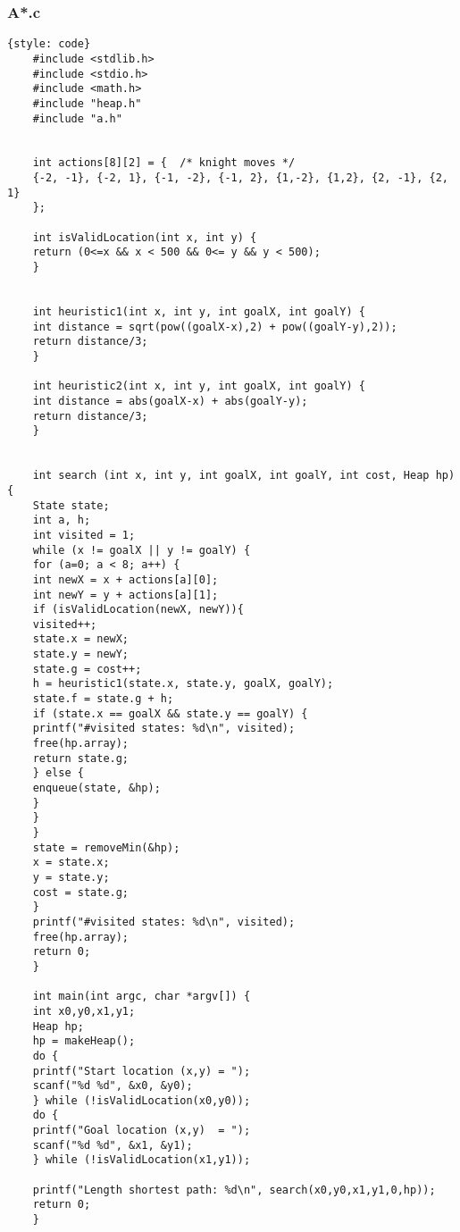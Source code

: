 \documentclass{article}
\begin{document}
	\subsubsection*{A*.c}
	\begin{lstlisting}{style: code}
	#include <stdlib.h>
	#include <stdio.h>
	#include <math.h>
	#include "heap.h"
	#include "a.h"
	
	
	int actions[8][2] = {  /* knight moves */
	{-2, -1}, {-2, 1}, {-1, -2}, {-1, 2}, {1,-2}, {1,2}, {2, -1}, {2, 1}
	};
	
	int isValidLocation(int x, int y) {
	return (0<=x && x < 500 && 0<= y && y < 500);
	}
	
	
	int heuristic1(int x, int y, int goalX, int goalY) {
	int distance = sqrt(pow((goalX-x),2) + pow((goalY-y),2));
	return distance/3;
	}
	
	int heuristic2(int x, int y, int goalX, int goalY) {
	int distance = abs(goalX-x) + abs(goalY-y);
	return distance/3;
	}
	
	
	int search (int x, int y, int goalX, int goalY, int cost, Heap hp) {
	State state;
	int a, h;
	int visited = 1;
	while (x != goalX || y != goalY) {
	for (a=0; a < 8; a++) {
	int newX = x + actions[a][0];
	int newY = y + actions[a][1];
	if (isValidLocation(newX, newY)){
	visited++;
	state.x = newX;
	state.y = newY;
	state.g = cost++;
	h = heuristic1(state.x, state.y, goalX, goalY);
	state.f = state.g + h;
	if (state.x == goalX && state.y == goalY) {
	printf("#visited states: %d\n", visited);
	free(hp.array);
	return state.g;
	} else {
	enqueue(state, &hp);
	}
	}
	}
	state = removeMin(&hp);
	x = state.x;
	y = state.y;
	cost = state.g;
	}
	printf("#visited states: %d\n", visited);
	free(hp.array);
	return 0;
	}
	
	int main(int argc, char *argv[]) {
	int x0,y0,x1,y1;
	Heap hp;
	hp = makeHeap();
	do {
	printf("Start location (x,y) = ");
	scanf("%d %d", &x0, &y0);
	} while (!isValidLocation(x0,y0));
	do {
	printf("Goal location (x,y)  = ");
	scanf("%d %d", &x1, &y1);
	} while (!isValidLocation(x1,y1));
	
	printf("Length shortest path: %d\n", search(x0,y0,x1,y1,0,hp));
	return 0;
	}
	\end{lstlisting}
	
\end{document}
